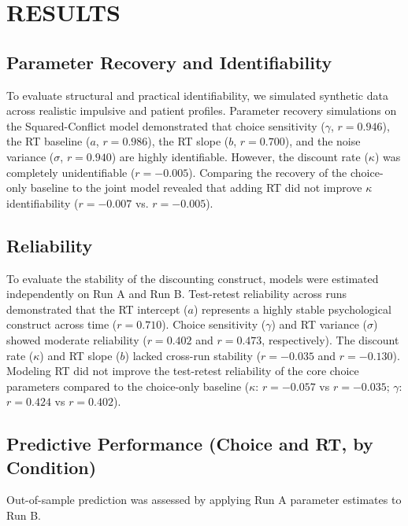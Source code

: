 \documentclass[11pt,a4paper]{article}
\theoremstyle{definition}
\begin{document}
\section{RESULTS}

\subsection{Parameter Recovery and Identifiability}

To evaluate structural and practical identifiability, we simulated synthetic data across realistic impulsive and patient profiles. Parameter recovery simulations on the Squared-Conflict model demonstrated that choice sensitivity ($\gamma$, $r=0.946$), the RT baseline ($a$, $r=0.986$), the RT slope ($b$, $r=0.700$), and the noise variance ($\sigma$, $r=0.940$) are highly identifiable. However, the discount rate ($\kappa$) was completely unidentifiable ($r=-0.005$). Comparing the recovery of the choice-only baseline to the joint model revealed that adding RT did not improve $\kappa$ identifiability ($r=-0.007$ vs. $r=-0.005$).

\subsection{Reliability}

To evaluate the stability of the discounting construct, models were estimated independently on Run A and Run B. Test-retest reliability across runs demonstrated that the RT intercept ($a$) represents a highly stable psychological construct across time ($r=0.710$). Choice sensitivity ($\gamma$) and RT variance ($\sigma$) showed moderate reliability ($r=0.402$ and $r=0.473$, respectively). The discount rate ($\kappa$) and RT slope ($b$) lacked cross-run stability ($r=-0.035$ and $r=-0.130$). Modeling RT did not improve the test-retest reliability of the core choice parameters compared to the choice-only baseline ($\kappa$: $r=-0.057$ vs $r=-0.035$; $\gamma$: $r=0.424$ vs $r=0.402$).

\subsection{Predictive Performance (Choice and RT, by Condition)}

Out-of-sample prediction was assessed by applying Run A parameter estimates to Run B.
\end{document}
